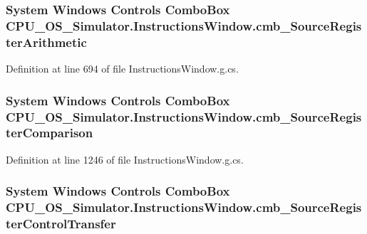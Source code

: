 \subsubsection[{cmb\+\_\+\+Source\+Register\+Arithmetic}]{\setlength{\rightskip}{0pt plus 5cm}System Windows Controls Combo\+Box C\+P\+U\+\_\+\+O\+S\+\_\+\+Simulator.\+Instructions\+Window.\+cmb\+\_\+\+Source\+Register\+Arithmetic\hspace{0.3cm}{\ttfamily [package]}}\label{class_c_p_u___o_s___simulator_1_1_instructions_window_aad493dd174601ec265d5ad261f33d525}


Definition at line 694 of file Instructions\+Window.\+g.\+cs.

\hypertarget{class_c_p_u___o_s___simulator_1_1_instructions_window_af7acb32053b1cf27ee94bbf47efc9fbe}{}
\subsubsection[{cmb\+\_\+\+Source\+Register\+Comparison}]{\setlength{\rightskip}{0pt plus 5cm}System Windows Controls Combo\+Box C\+P\+U\+\_\+\+O\+S\+\_\+\+Simulator.\+Instructions\+Window.\+cmb\+\_\+\+Source\+Register\+Comparison\hspace{0.3cm}{\ttfamily [package]}}\label{class_c_p_u___o_s___simulator_1_1_instructions_window_af7acb32053b1cf27ee94bbf47efc9fbe}


Definition at line 1246 of file Instructions\+Window.\+g.\+cs.

\hypertarget{class_c_p_u___o_s___simulator_1_1_instructions_window_a652354e464657693cf70a292b3389626}{}
\subsubsection[{cmb\+\_\+\+Source\+Register\+Control\+Transfer}]{\setlength{\rightskip}{0pt plus 5cm}System Windows Controls Combo\+Box C\+P\+U\+\_\+\+O\+S\+\_\+\+Simulator.\+Instructions\+Window.\+cmb\+\_\+\+Source\+Register\+Control\+Transfer\hspace{0.3cm}{\ttfamily [package]}}\label{class_c_p_u___o_s___simulator_1_1_instructions_window_a652354e464657693cf70a292b3389626}


